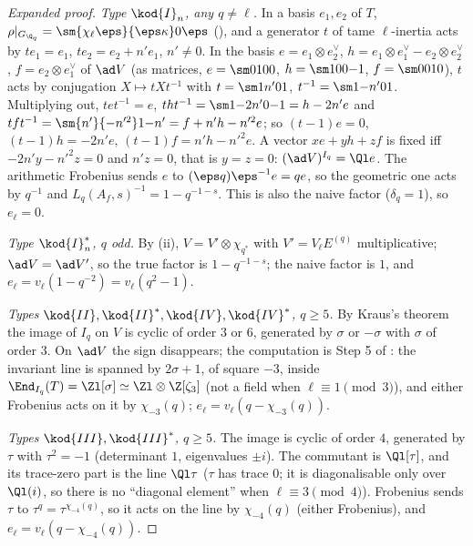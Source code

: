 \begin{sloppypar}
\begin{proof}[Expanded proof]
\emph{Type $\kod{I}_n$, any $q\ne\ell$.} In a basis $e_1,e_2$ of $T$, $\rho|_{G_{\Q_q}}=\sm{\chi_\ell\eps}{\eps\kappa}0{\eps}$ (), and a generator $t$ of tame $\ell$-inertia acts by
$te_1=e_1$, $te_2=e_2+n'e_1$, $n'\ne0$. In the basis $e=e_1\otimes e_2^\vee$, $h=e_1\otimes e_1^\vee-e_2\otimes e_2^\vee$, $f=e_2\otimes e_1^\vee$ of $\ad V$ (as matrices, $e=\sm0100$, $h=\sm100{-1}$,
$f=\sm0010$), $t$ acts by conjugation $X\mapsto tXt^{-1}$ with $t=\sm1{n'}01$, $t^{-1}=\sm1{-n'}01$. Multiplying out, $tet^{-1}=e$, $tht^{-1}=\sm1{-2n'}0{-1}=h-2n'e$ and
$tft^{-1}=\sm{n'}{-n'^2}1{-n'}=f+n'h-n'^2e$; so $(t-1)e=0$, $(t-1)h=-2n'e$, $(t-1)f=n'h-n'^2e$. A vector $xe+yh+zf$ is fixed iff $-2n'y-n'^2z=0$ and $n'z=0$, that is $y=z=0$:
$(\ad V)^{I_q}=\Ql e$. The arithmetic Frobenius sends $e$ to $(\eps q)\eps^{-1}e=qe$, so the geometric one acts by $q^{-1}$ and $L_q(A_f,s)^{-1}=1-q^{-1-s}$.
This is also the naive factor ($\delta_q=1$), so $e_\ell=0$.

\emph{Type $\kod{I}_n^*$, $q$ odd.} By (ii), $V=V'\otimes\chi_{q^*}$ with $V'=V_\ell E^{(q)}$ multiplicative; $\ad V=\ad V'$, so the true factor is $1-q^{-1-s}$; the
naive factor is $1$, and $e_\ell=v_\ell(1-q^{-2})=v_\ell(q^2-1)$.

\emph{Types $\kod{II},\kod{II}^*,\kod{IV},\kod{IV}^*$, $q\ge5$.} By Kraus's theorem the image of $I_q$ on $V$ is cyclic of order $3$ or $6$, generated by $\sigma$ or $-\sigma$ with $\sigma$ of order $3$.
On $\ad V$ the sign disappears; the computation is Step 5 of : the invariant line is spanned by $2\sigma+1$, of square $-3$, inside $\End_{I_q}(T)=\Zl[\sigma]\simeq\Zl\otimes\Z[\zeta_3]$
(not a field when $\ell\equiv1\pmod3$), and either Frobenius acts on it by $\chi_{-3}(q)$; $e_\ell=v_\ell(q-\chi_{-3}(q))$.

\emph{Types $\kod{III},\kod{III}^*$, $q\ge5$.} The image is cyclic of order $4$, generated by $\tau$ with $\tau^2=-1$ (determinant $1$, eigenvalues $\pm i$). The commutant is $\Ql[\tau]$, and its
trace-zero part is the line $\Ql\tau$ ($\tau$ has trace $0$; it is diagonalisable only over $\Ql(i)$, so there is no ``diagonal element'' when $\ell\equiv3\pmod4$). Frobenius sends $\tau$
to $\tau^q=\tau^{\chi_{-4}(q)}$, so it acts on the line by $\chi_{-4}(q)$ (either Frobenius), and $e_\ell=v_\ell(q-\chi_{-4}(q))$.


\end{proof}
\end{sloppypar}
